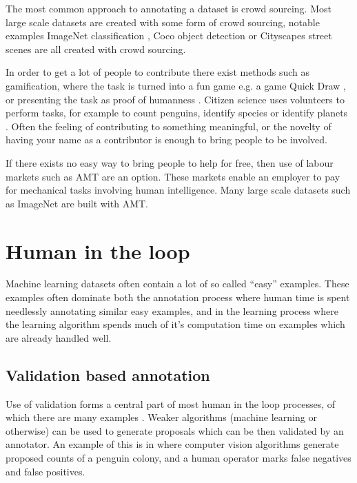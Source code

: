 The most common approach to annotating a dataset is crowd sourcing. Most large scale datasets are created with some form of crowd sourcing, notable examples ImageNet classification \cite{JiaDeng2009}, Coco object detection \cite{Lin2014} or Cityscapes street scenes \cite{Cordts2016} are all created with crowd sourcing. 

In order to get a lot of people to contribute there exist methods such as gamification, where the task is turned into a fun game  e.g. a game Quick Draw \cite{Ha2017}, or presenting the task as proof of humanness \cite{Goodfellow2013a}. Citizen science uses volunteers to perform tasks, for example to count penguins, identify species or identify planets \cite{Simpson2014, Masters2016}. Often the feeling of contributing to something meaningful, or the novelty of having your name as a contributor is enough to bring people to be involved.

If there exists no easy way to bring people to help for free, then use of labour markets such as \gls{AMT} are an option. These markets enable an employer to pay for mechanical tasks involving human intelligence. Many large scale datasets such as ImageNet \cite{Russakovsky2015} are built with \gls{AMT}. 


\section{Human in the loop}



Machine learning datasets often contain a lot of so called ``easy'' examples. These examples often dominate both the annotation process where human time is spent needlessly annotating similar easy examples, and in the learning process where the learning algorithm spends much of it's computation time on examples which are already handled well. 


\subsection{Validation based annotation}

Use of validation forms a central part of most human in the loop processes, of which there are many examples \cite{Yao2012, McNeill2011, Adhikaria2018, Castrejon2017, Papadopoulos2016, Russakovsky2015a}. Weaker algorithms (machine learning or otherwise) can be used to generate proposals which can be then validated by an annotator. An example of this is in \cite{McNeill2011} where computer vision algorithms generate proposed counts of a penguin colony, and a human operator marks false negatives and false positives.

